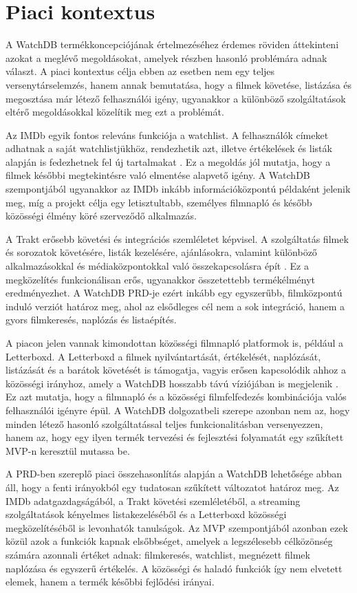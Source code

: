 \section{Piaci kontextus}

A WatchDB termékkoncepciójának értelmezéséhez érdemes röviden áttekinteni azokat a meglévő megoldásokat, amelyek részben hasonló problémára adnak választ. A piaci kontextus célja ebben az esetben nem egy teljes versenytárselemzés, hanem annak bemutatása, hogy a filmek követése, listázása és megosztása már létező felhasználói igény, ugyanakkor a különböző szolgáltatások eltérő megoldásokkal közelítik meg ezt a problémát.

Az IMDb egyik fontos releváns funkciója a watchlist. A felhasználók címeket adhatnak a saját watchlistjükhöz, rendezhetik azt, illetve értékelések és listák alapján is fedezhetnek fel új tartalmakat \cite{imdbWatchlistFaq}. Ez a megoldás jól mutatja, hogy a filmek későbbi megtekintésre való elmentése alapvető igény. A WatchDB szempontjából ugyanakkor az IMDb inkább információközpontú példaként jelenik meg, míg a projekt célja egy letisztultabb, személyes filmnapló és később közösségi élmény köré szerveződő alkalmazás.

A Trakt erősebb követési és integrációs szemléletet képvisel. A szolgáltatás filmek és sorozatok követésére, listák kezelésére, ajánlásokra, valamint különböző alkalmazásokkal és médiaközpontokkal való összekapcsolásra épít \cite{traktDiscoverTrackShare}. Ez a megközelítés funkcionálisan erős, ugyanakkor összetettebb termékélményt eredményezhet. A WatchDB PRD-je ezért inkább egy egyszerűbb, filmközpontú induló verziót határoz meg, ahol az elsődleges cél nem a sok integráció, hanem a gyors filmkeresés, naplózás és listaépítés.

A piacon jelen vannak kimondottan közösségi filmnapló platformok is, például a Letterboxd. A Letterboxd a filmek nyilvántartását, értékelését, naplózását, listázását és a barátok követését is támogatja, vagyis erősen kapcsolódik ahhoz a közösségi irányhoz, amely a WatchDB hosszabb távú víziójában is megjelenik \cite{letterboxdSocialFilmDiscovery}. Ez azt mutatja, hogy a filmnapló és a közösségi filmfelfedezés kombinációja valós felhasználói igényre épül. A WatchDB dolgozatbeli szerepe azonban nem az, hogy minden létező hasonló szolgáltatással teljes funkcionalitásban versenyezzen, hanem az, hogy egy ilyen termék tervezési és fejlesztési folyamatát egy szűkített MVP-n keresztül mutassa be.

A PRD-ben szereplő piaci összehasonlítás alapján a WatchDB lehetősége abban áll, hogy a fenti irányokból egy tudatosan szűkített változatot határoz meg. Az IMDb adatgazdagságából, a Trakt követési szemléletéből, a streaming szolgáltatások kényelmes listakezeléséből és a Letterboxd közösségi megközelítéséből is levonhatók tanulságok. Az MVP szempontjából azonban ezek közül azok a funkciók kapnak elsőbbséget, amelyek a legszélesebb célközönség számára azonnali értéket adnak: filmkeresés, watchlist, megnézett filmek naplózása és egyszerű értékelés. A közösségi és haladó funkciók így nem elvetett elemek, hanem a termék későbbi fejlődési irányai.
